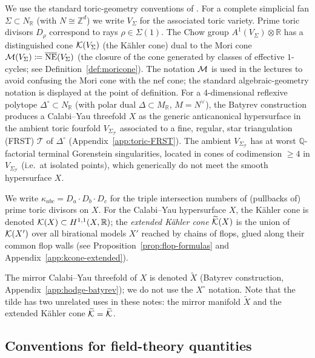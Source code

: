 We use the standard toric-geometry conventions of
\cite{cox-little-schenck:toric}. For a complete simplicial fan
$\Sigma \subset N_{\mathbb{R}}$ (with $N \cong \mathbb{Z}^d$) we write
$V_\Sigma$ for the associated toric variety. Prime toric divisors
$D_\rho$ correspond to rays $\rho\in\Sigma(1)$. The Chow group
$A^1(V_\Sigma) \otimes \mathbb{R}$ has a distinguished cone
$\mathcal{K}(V_\Sigma)$ (the K\"ahler cone) dual to the Mori cone
$\mathcal{M}(V_\Sigma)\coloneqq  \overline{\mathrm{NE}}(V_\Sigma)$ (the closure of
the cone generated by classes of effective $1$-cycles; see
Definition~\ref{def:moricone}). The notation $\mathcal{M}$ is used in the
lectures to avoid confusing the Mori cone with the nef cone; the
standard algebraic-geometry notation is displayed at the point of
definition. For a 4-dimensional reflexive polytope
$\Delta^\circ \subset N_\mathbb{R}$ (with polar dual
$\Delta\subset M_\mathbb{R}$, $M=N^\vee$), the Batyrev construction
\cite{Batyrev:1993oya} produces a Calabi--Yau threefold $X$ as the
generic anticanonical hypersurface in the ambient toric fourfold
$V_{\Sigma_{\mathcal{T}}}$ associated to a fine, regular, star
triangulation (FRST) $\mathcal{T}$ of $\Delta^\circ$
(Appendix~\ref{app:toric-FRST}). The ambient
$V_{\Sigma_{\mathcal{T}}}$ has at worst $\mathbb{Q}$-factorial
terminal Gorenstein singularities, located in cones of codimension
$\geq 4$ in $V_{\Sigma_{\mathcal{T}}}$ (i.e.\ at isolated points),
which generically do not meet the smooth hypersurface $X$.

We write $\kappa_{abc} = D_a\cdot D_b\cdot D_c$ for the triple
intersection numbers of (pullbacks of) prime toric divisors on $X$.
For the Calabi--Yau hypersurface $X$, the K\"ahler cone is denoted
$\mathcal{K}(X) \subset H^{1,1}(X,\mathbb{R})$; the \emph{extended K\"ahler
cone} $\widetilde{\mathcal{K}}(X)$ is the union of $\mathcal{K}(X')$ over all birational models
$X'$ reached by chains of flops, glued along their common flop walls
(see Proposition~\ref{prop:flop-formulas} and
Appendix~\ref{app:kcone-extended}).

The mirror Calabi--Yau threefold of $X$ is denoted $\widetilde X$
(Batyrev construction, Appendix~\ref{app:hodge-batyrev}); we do not
use the $X^\circ$ notation. Note that the tilde has two unrelated
uses in these notes: the mirror manifold $\widetilde X$ and the
extended K\"ahler cone $\widetilde{\mathcal{K}} = \widetilde{\mathcal{K}}$.

\subsection{Conventions for field-theory quantities}

